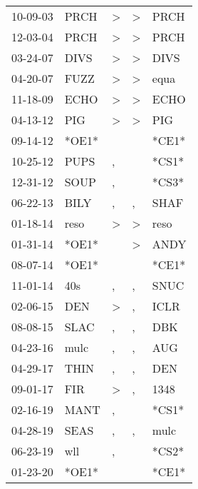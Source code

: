 \begin{supertabular}{lllll}
 10-09-03 &   PRCH &  \textgreater &  \textgreater &   PRCH \\
 12-03-04 &   PRCH &  \textgreater &  \textgreater &   PRCH \\
 03-24-07 &   DIVS &  \textgreater &  \textgreater &   DIVS \\
 04-20-07 &   FUZZ &  \textgreater &  \textgreater &   equa \\
 11-18-09 &   ECHO &  \textgreater &  \textgreater &   ECHO \\
 04-13-12 &    PIG &  \textgreater &  \textgreater &    PIG \\
 09-14-12 &  *OE1* &               &               &  *CE1* \\
 10-25-12 &   PUPS &             , &               &  *CS1* \\
 12-31-12 &   SOUP &             , &               &  *CS3* \\
 06-22-13 &   BILY &             , &             , &   SHAF \\
 01-18-14 &   reso &  \textgreater &  \textgreater &   reso \\
 01-31-14 &  *OE1* &               &  \textgreater &   ANDY \\
 08-07-14 &  *OE1* &               &               &  *CE1* \\
 11-01-14 &    40s &             , &             , &   SNUC \\
 02-06-15 &    DEN &  \textgreater &             , &   ICLR \\
 08-08-15 &   SLAC &             , &             , &    DBK \\
 04-23-16 &   mulc &             , &             , &    AUG \\
 04-29-17 &   THIN &             , &             , &    DEN \\
 09-01-17 &    FIR &  \textgreater &             , &   1348 \\
 02-16-19 &   MANT &             , &               &  *CS1* \\
 04-28-19 &   SEAS &             , &             , &   mulc \\
 06-23-19 &    wll &             , &               &  *CS2* \\
 01-23-20 &  *OE1* &               &               &  *CE1* \\
\end{supertabular}
